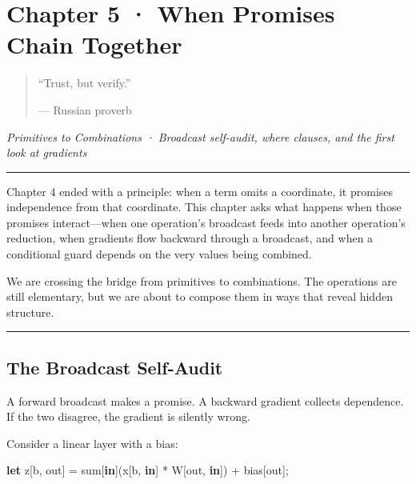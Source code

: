 \documentclass[11pt,]{article}
\newenvironment{Shaded}{}{}
\newcommand{\KeywordTok}[1]{\textcolor[rgb]{0.00,0.44,0.13}{\textbf{#1}}}
\newcommand{\NormalTok}[1]{#1}
\newcommand{\OperatorTok}[1]{\textcolor[rgb]{0.40,0.40,0.40}{#1}}
\begin{document}
\newpage

\hypertarget{chapter-5-when-promises-chain-together}{%
\section{Chapter 5 · When Promises Chain
Together}\label{chapter-5-when-promises-chain-together}}

\begin{quote}
``Trust, but verify.''

--- Russian proverb
\end{quote}

\emph{Primitives to Combinations · Broadcast self-audit, where clauses,
and the first look at gradients}

\begin{center}\rule{0.5\linewidth}{0.4pt}\end{center}

Chapter 4 ended with a principle: when a term omits a coordinate, it
promises independence from that coordinate. This chapter asks what
happens when those promises interact---when one operation's broadcast
feeds into another operation's reduction, when gradients flow backward
through a broadcast, and when a conditional guard depends on the very
values being combined.

We are crossing the bridge from primitives to combinations. The
operations are still elementary, but we are about to compose them in
ways that reveal hidden structure.

\begin{center}\rule{0.5\linewidth}{0.4pt}\end{center}

\hypertarget{the-broadcast-self-audit}{%
\subsection{The Broadcast Self-Audit}\label{the-broadcast-self-audit}}

A forward broadcast makes a promise. A backward gradient collects
dependence. If the two disagree, the gradient is silently wrong.

Consider a linear layer with a bias:

\begin{Shaded}
\begin{Highlighting}[]
\KeywordTok{let}\NormalTok{ z}\OperatorTok{[}\NormalTok{b, out}\OperatorTok{]}\NormalTok{ = sum}\OperatorTok{[}\KeywordTok{in}\OperatorTok{]}\NormalTok{(x}\OperatorTok{[}\NormalTok{b, }\KeywordTok{in}\OperatorTok{]}\NormalTok{ * W}\OperatorTok{[}\NormalTok{out, }\KeywordTok{in}\OperatorTok{]}\NormalTok{) + bias}\OperatorTok{[}\NormalTok{out}\OperatorTok{]}\NormalTok{;}
\end{Highlighting}
\end{Shaded}
\end{document}
